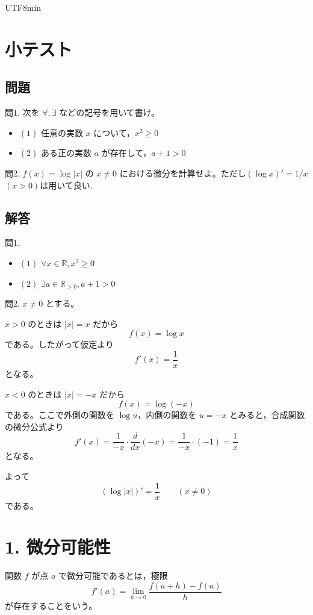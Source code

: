 \documentclass[a4paper,12pt]{article}
\begin{document}
\begin{CJK}{UTF8}{min}
\section*{小テスト}

\subsection*{問題}

問1. 次を $\forall,\exists$ などの記号を用いて書け。
\begin{itemize}
\item $(1)$ 任意の実数 $x$ について，$x^2\geq 0$
\item $(2)$ ある正の実数 $a$ が存在して，$a+1>0$
\end{itemize}

問2. $f(x)=\log |x|$ の $x\neq 0$ における微分を計算せよ。ただし$(\log x)' = 1/x$ $(x>0)$は用いて良い.

\subsection*{解答}

問1.
\begin{itemize}
\item $(1)$ $\forall x \in \mathbb{R}, x^2 \geq 0$
\item $(2)$ $\exists a \in \mathbb{R}_{>0}, a+1>0$
\end{itemize}

問2. $x\neq 0$ とする。

$x>0$ のときは $|x|=x$ だから
\[
f(x)=\log x
\]
である。したがって仮定より
\[
f'(x)=\frac{1}{x}
\]
となる。

$x<0$ のときは $|x|=-x$ だから
\[
f(x)=\log(-x)
\]
である。ここで外側の関数を $\log u$，内側の関数を $u=-x$ とみると，合成関数の微分公式より
\[
f'(x)=\frac{1}{-x}\cdot \frac{d}{dx}(-x)
=\frac{1}{-x}\cdot (-1)
=\frac{1}{x}
\]
となる。

よって
\[
(\log|x|)'=\frac{1}{x}\qquad (x\neq 0)
\]
である。

\section*{1. 微分可能性}

\begin{definition}
関数 $f$ が点 $a$ で微分可能であるとは，極限
\[
f'(a)=\lim_{h\to 0}\frac{f(a+h)-f(a)}{h}
\]
が存在することをいう。
\end{definition}


\end{CJK}
\end{document}
